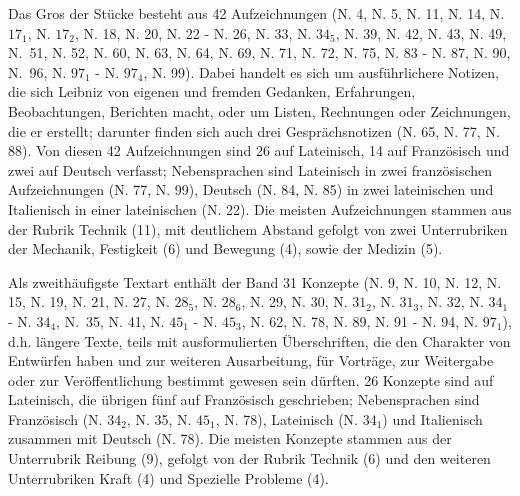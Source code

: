 Das Gros der Stücke besteht aus 42 Aufzeichnungen (N. 4, N. 5, N. 11, N. 14, N.~$17_1$, N. $17_2$, N. 18, N. 20, N. 22 - N. 26, N. 33, N. $34_5$, N. 39, N. 42, N. 43, N. 49, N.~51, N. 52, N. 60, N. 63, N. 64, N. 69, N. 71, N. 72, N. 75, N. 83 - N. 87, N. 90, N.~96, N. $97_1$ - N. $97_4$, N. 99). Dabei handelt es sich um ausführlichere Notizen, die sich Leibniz von eigenen und fremden Gedanken, Erfahrungen, Beobachtungen, Berichten macht, oder um Listen, Rechnungen oder Zeichnungen, die er erstellt; darunter finden sich auch drei Gesprächsnotizen (N. 65, N. 77, N. 88). Von diesen 42 Aufzeichnungen sind 26 auf Lateinisch, 14 auf Französisch und zwei auf Deutsch verfasst; Nebensprachen sind Lateinisch in zwei französischen Aufzeichnungen (N. 77, N. 99), Deutsch (N. 84, N. 85) in zwei lateinischen und Italienisch in einer lateinischen (N. 22). Die meisten Aufzeichnungen stammen aus der Rubrik Technik (11), mit deutlichem Abstand gefolgt von zwei Unterrubriken der Mechanik, Festigkeit (6) und Bewegung (4), sowie der Medizin (5). \par
Als zweithäufigste Textart enthält der Band 31 Konzepte (N. 9, N. 10, N. 12, N. 15, N. 19, N. 21, N. 27, N. $28_5$, N. $28_6$, N. 29, N. 30, N. $31_2$, N. $31_3$, N. 32, N. $34_1$ - N. $34_4$, N.~35, N. 41, N. $45_1$ - N. $45_3$, N. 62, N. 78, N. 89, N. 91 - N. 94, N. $97_1$), d.h. längere Texte, teils mit ausformulierten Überschriften, die den Charakter von Entwürfen haben und zur weiteren Ausarbeitung, für Vorträge, zur Weitergabe oder zur Veröffentlichung bestimmt gewesen sein dürften. 26 Konzepte sind auf Lateinisch, die übrigen fünf auf Französisch geschrieben; Nebensprachen sind Französisch (N. $34_2$, N. 35, N. $45_1$, N. 78), Lateinisch (N. $34_1$) und Italienisch zusammen mit Deutsch (N. 78). Die meisten Konzepte stammen aus der Unterrubrik Reibung (9), gefolgt von der Rubrik Technik (6) und den weiteren Unterrubriken Kraft (4) und Spezielle Probleme (4).\par

